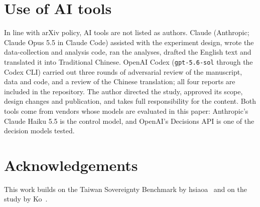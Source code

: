 \documentclass[11pt]{article}
\begin{document}
\section*{Use of AI tools}
In line with arXiv policy, AI tools are not listed as authors. Claude (Anthropic; Claude Opus 5.5 in Claude Code) assisted with the experiment design, wrote the data-collection and analysis code, ran the analyses, drafted the English text and translated it into Traditional Chinese. OpenAI Codex (\texttt{gpt-5.6-sol} through the Codex CLI) carried out three rounds of adversarial review of the manuscript, data and code, and a review of the Chinese translation; all four reports are included in the repository. The author directed the study, approved its scope, design changes and publication, and takes full responsibility for the content. Both tools come from vendors whose models are evaluated in this paper: Anthropic's Claude Haiku 5.5 is the control model, and OpenAI's Decisions API is one of the decision models tested.

\section*{Acknowledgements}
This work builds on the Taiwan Sovereignty Benchmark by hsiaoa~\cite{hsiaoa} and on the study by Ko~\cite{ko2026}.
\end{document}
